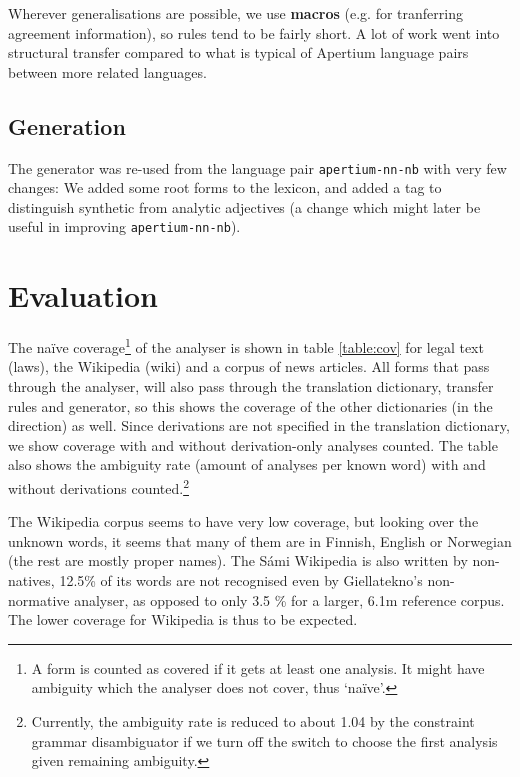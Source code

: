\documentclass{book}
\begin{document}
Wherever generalisations are possible, we use \textbf{macros} (e.g.
for tranferring agreement information), so rules tend to be fairly
short. A lot of work went into structural transfer compared to what is
typical of Apertium language pairs between more related languages.

\subsection{Generation}
The generator was re-used from the language pair
\texttt{apertium-nn-nb} with very few changes: We added some root
forms to the lexicon, and added a tag to distinguish synthetic from analytic
adjectives (a change which might later be useful in improving
\texttt{apertium-nn-nb}).

\section{Evaluation}
\label{sec:eval}
The na\"{i}ve coverage\footnote{A form is counted as covered if it
  gets at least one analysis. It might have ambiguity which the
  analyser does not cover, thus `na\"{i}ve'.} of the analyser is shown
in table \ref{table:cov} for legal text (laws), the \sme{} Wikipedia
(wiki) and a corpus of \sme{} news articles. All forms that pass
through the analyser, will also pass through the translation
dictionary, transfer rules and generator, so this shows the coverage
of the other dictionaries (in the \smenob{} direction) as well. Since
derivations are not specified in the translation dictionary, we show
coverage with and without derivation-only analyses counted. The table
also shows the ambiguity rate (amount of analyses per known word) with
and without derivations counted.\footnote{Currently, the ambiguity
  rate is reduced to about 1.04 by the constraint grammar
  disambiguator if we turn off the switch to choose the first analysis
  given remaining ambiguity.}


The Wikipedia corpus seems to have very low coverage, but looking over
the unknown words, it seems that many of them are in Finnish, English
or Norwegian (the rest are mostly proper names). The S\'{a}mi Wikipedia
is also written by non-natives, 12.5\% of its words are not recognised
even by Giellatekno's non-normative analyser, as opposed to only 3.5 \% for
a larger, 6.1m reference corpus. The lower coverage for Wikipedia is thus to
be expected.
\end{document}
